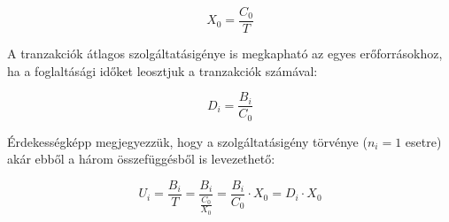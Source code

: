 $$X_0 = \frac{C_0}{T}$$

A tranzakciók átlagos szolgáltatásigénye is megkapható az egyes erőforrásokhoz, ha a foglaltásági időket leosztjuk a tranzakciók számával:

$$D_i = \frac{B_i}{C_0}$$

Érdekességképp megjegyezzük, hogy a szolgáltatásigény törvénye ($n_i = 1$ esetre) akár ebből a három összefüggésből is levezethető:

$$U_i = \frac{B_i}{T} = \frac{B_i}{\frac{C_0}{X_0}} = \frac{B_i}{C_0} \cdot X_0 = D_i \cdot X_0$$
